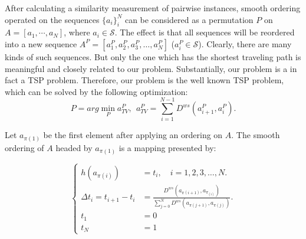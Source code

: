 \documentclass{ws-ijwmip}
\begin{document}
After calculating a similarity measurement of pairwise instances, 
smooth ordering operated on the sequences $\{a_i\}_i^N$ can be considered as a permutation $P$ on $A=[a_1, \cdots, a_N]$, where $a_i \in \mathcal{S}$.
The effect is that all sequences will be reordered into a new sequence $A^P=[a_1^P,a_2^P,a_3^P,\dots,a_N^P]$ ($a_i^P \in \mathcal{S}$). 
Clearly, there are many kinds of such sequences. 
But only the one which has the shortest traveling path is meaningful and closely related to our problem.
Substantially, our problem is a in fact a TSP problem.
Therefore, our problem is the well known TSP problem, 
which can be solved by the following optimization:
\begin{equation}
  P = arg \min _P a_{TV}^P, ~~ a_{TV}^P = \sum_{i=1}^{N-1}D^{ws}(a_{i+1}^P,a_i^P).
   \label{equ2.11}
\end{equation}
%


%

Let $a_{\pi(1)}$ be the first element after applying an ordering on $A$. 
The smooth ordering of $A$ headed by $a_{\pi(1)}$ is a mapping presented by: 

\begin{equation}
\left\{
\begin{aligned}
h(a_{\pi(i)}) &= t_i,  \quad i=1,2,3,\dots,N. \\
\Delta t_i = t_{i+1} - t_i & = \frac{D^{ws}(a_{\pi(i+1)},a_{\pi_{(i)}})}{\sum _{j=0}^{N}D^{ws}(a_{\pi(j+1)},a_{\pi(j)})}.\\
t_1 & =0\\
t_N & =1
\end{aligned}
\right.
\end{equation}
\end{document}
